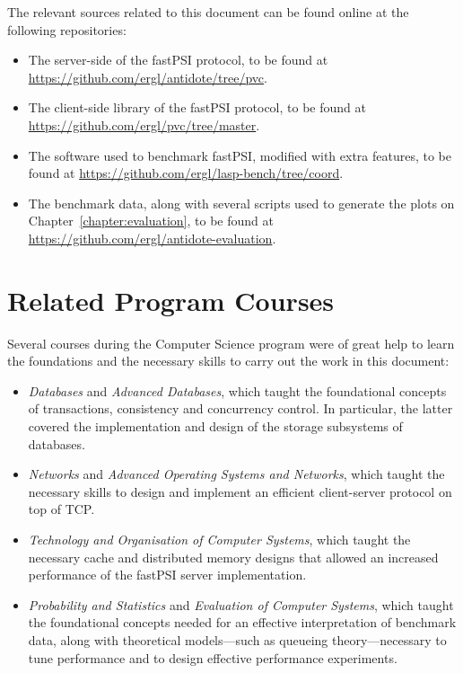 The relevant sources related to this document can be found online at the following repositories:

\begin{itemize}
    \item The server-side of the fastPSI protocol, to be found at \url{https://github.com/ergl/antidote/tree/pvc}.

    \item The client-side library of the fastPSI protocol, to be found at \url{https://github.com/ergl/pvc/tree/master}.

    \item The software used to benchmark fastPSI, modified with extra features, to be found at \url{https://github.com/ergl/lasp-bench/tree/coord}.

    \item The benchmark data, along with several scripts used to generate the plots on Chapter~\ref{chapter:evaluation}, to be found at \url{https://github.com/ergl/antidote-evaluation}.
\end{itemize}

\section{Related Program Courses}

Several courses during the Computer Science program were of great help to learn the foundations and the necessary skills to carry out the work in this document:

\begin{itemize}
    \item \emph{Databases} and \emph{Advanced Databases}, which taught the foundational concepts of transactions, consistency and concurrency control. In particular, the latter covered the implementation and design of the storage subsystems of databases.

    \item \emph{Networks} and \emph{Advanced Operating Systems and Networks}, which taught the necessary skills to design and implement an efficient client-server protocol on top of TCP.

    \item \emph{Technology and Organisation of Computer Systems}, which taught the necessary cache and distributed memory designs that allowed an increased performance of the fastPSI server implementation.

    \item \emph{Probability and Statistics} and \emph{Evaluation of Computer Systems}, which taught the foundational concepts needed for an effective interpretation of benchmark data, along with theoretical models---such as queueing theory---necessary to tune performance and to design effective performance experiments.
\end{itemize}
